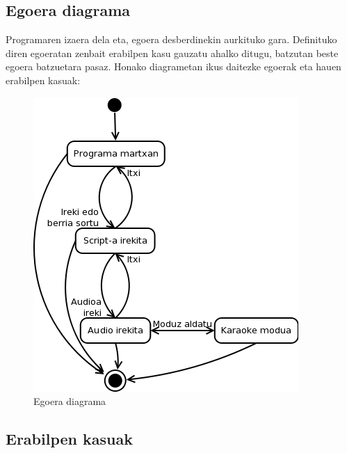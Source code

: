 \subsection{Egoera diagrama}
Programaren izaera dela eta, egoera desberdinekin aurkituko gara. Definituko diren egoeratan zenbait erabilpen kasu gauzatu ahalko ditugu, batzutan beste egoera batzuetara pasaz. Honako diagrametan ikus daitezke egoerak eta hauen erabilpen kasuak:

\begin{figure}[htp]
\begin{center}
\includegraphics[scale=0.6]{Pictures/Chapter4/Analisia/ED.png}
\caption{Egoera diagrama}
\label{ed}
\end{center}
\end{figure}
\newpage
\subsection{Erabilpen kasuak}
